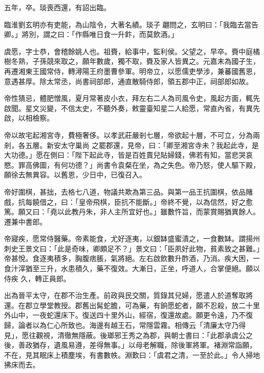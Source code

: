 \begin{pinyinscope}
 五年，卒。琰喪西還，有詔出臨。



 臨淮劉玄明亦有吏能，為山陰令，大著名績。琰子翽問之，玄明曰：「我臨去當告卿。」將別，謂之曰：「作縣唯日食一升飰，而莫飲酒。」



 虞愿，字士恭，會稽餘姚人也。祖賚，給事中，監利侯。父望之，早卒。賚中庭橘樹冬熟，子孫競來取之，願年數歲，獨不取，賚及家人皆異之。元嘉末為國子生，再遷湘東王國常侍，轉潯陽王府墨曹參軍。明帝立，以愿儒吏學涉，兼蕃國舊恩，意遇甚厚。除太常丞，尚書祠部郎，通直散騎侍郎，領五郡中正，祠部郎如故。



 帝性猜忌，體肥憎風，夏月常著皮小衣，拜左右二人為司風令史，風起方面，輒先啟聞。星文災變，不信太史，不聽外奏，敕靈臺知星二人給愿，常直內省，有異先啟，以相檢察。



 帝以故宅起湘宮寺，費極奢侈。以孝武莊嚴剎七層，帝欲起十層，不可立，分為兩剎，各五層。新安太守巢尚
 之罷郡還，見帝，曰：「卿至湘宮寺未？我起此寺，是大功德。」愿在側曰：「陛下起此寺，皆是百姓賣兒貼婦錢，佛若有知，當悲哭哀愍。罪高佛圖，有何功德？」尚書令袁粲在坐，為之失色。帝乃怒，使人驅下殿，願徐去無異容。以舊恩，少日中，已復召入。



 帝好圍棋，甚拙，去格七八道，物議共欺為第三品。與第一品王抗圍棋，依品賭戲，抗每饒借之，曰：「皇帝飛棋，臣抗不能斷。」帝終不覺，以為信然，好之愈篤。願又曰：「堯以此教丹朱，非人主所宜好也。」雖數忤旨，而蒙賞賜猶異餘人。遷兼中書郎。



 帝寢疾，愿常侍醫藥。帝素能食，尤好逐夷，以銀缽盛蜜漬之，一食數缽。謂揚州刺史王景文曰：「此是奇味，卿頗足不？」景文曰：「臣夙好此物，貧素致之甚難。」帝甚悅。食逐夷積多，胸腹痞脹，氣將絕。左右啟飲數升酢酒，乃消。疾大困，一食汁滓猶至三升，水患積久，藥不復效。大漸日，正坐，呼道人，合掌便絕。願以侍疾
 久，轉正員郎。



 出為晉平太守，在郡不治生產。前政與民交關，質錄其兒婦，愿遣人於道奪取將還。在郡立學堂教授。郡舊出髯蛇膽，可為藥，有餉愿蛇者，願不忍殺，放二十里外山中，一夜蛇還床下。復送四十里外山，經宿，復還故處。願更令遠，乃不復歸，論者以為仁心所致也。海邊有越王石，常隱雲霧。相傳云「清廉太守乃得見」，愿往觀視，清徹無隱蔽。後瑯邪王秀之為郡，與朝士書曰：「此郡承虞公之後，善政猶存，遺風易遵，差得無事。」以母老解職，除後軍將軍。褚淵常詣願，不在，見其眠床上積塵埃，有書數帙。淵歎曰：「虞君之清，一至於此。」令人掃地拂床而去。




\end{pinyinscope}
